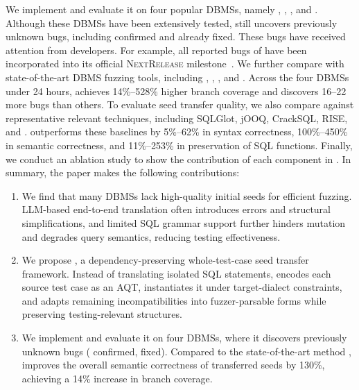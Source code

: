 \documentclass[conference]{IEEEtran}
\begin{document}
We implement \tool{} and evaluate it on four popular DBMSs, namely \duckdb{}, \clickhouse{}, \monetdb{}, and \virtuoso{}.
Although these DBMSs have been extensively tested, \tool{} still uncovers \bugcnt{} previously unknown bugs, including \bugconfirmcnt{} confirmed and \bugfixcnt{} already fixed.
These bugs have received attention from developers.
For example, all reported bugs of \monetdb{} have been incorporated into its official \textsc{NextRelease} milestone~\cite{monetdb-nextrelease}.
We further compare \tool{} with state-of-the-art DBMS fuzzing tools, including \sqlancer{}, \squirrel{}, \griffin{}, and \sedar{}.
Across the four DBMSs under 24 hours, \tool{} achieves 14\%--528\% higher branch coverage and discovers 16--22 more bugs than others.
To evaluate seed transfer quality, we also compare \tool{} against representative relevant techniques, including SQLGlot, jOOQ, CrackSQL, RISE, and \sedar{}.
\tool{} outperforms these baselines by 5\%--62\% in syntax correctness, 100\%--450\% in semantic correctness, and 11\%--253\% in preservation of SQL functions.
Finally, we conduct an ablation study to show the contribution of each component in \tool{}.
In summary, the paper makes the following contributions:


\begin{enumerate}[leftmargin=*]
\item We find that many DBMSs lack high-quality initial seeds for efficient fuzzing. LLM-based end-to-end translation often introduces errors and structural simplifications, and limited SQL grammar support further hinders mutation and degrades query semantics, reducing testing effectiveness.
\item We propose \tool{}, a dependency-preserving whole-test-case seed transfer framework. Instead of translating isolated SQL statements, \tool{} encodes each source test case as an AQT, instantiates it under target-dialect constraints, and adapts remaining incompatibilities into fuzzer-parsable forms while preserving testing-relevant structures.
\item We implement \tool{} and evaluate it on four DBMSs, where it discovers \bugcnt{} previously unknown bugs (\bugconfirmcnt{} confirmed, \bugfixcnt{} fixed). 
Compared to the state-of-the-art method \sedar{}, \tool{} improves the overall semantic correctness of transferred seeds by 130\%, achieving a 14\% increase in branch coverage.
\end{enumerate}
\end{document}
